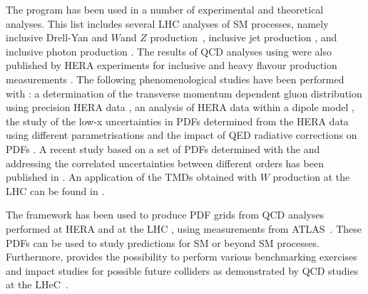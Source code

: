 The \fitter program has been used in a number of experimental and theoretical analyses. 
This list includes several LHC analyses of SM processes, namely
inclusive Drell-Yan and $W$and $Z$ production~\cite{atlas:strange,cms:strange,atlas:hm,Aad:2014qja,Aad:2014xca}, 
inclusive jet production \cite{atlas:jets}, and inclusive photon production \cite{atlas:photons}.
The results of QCD analyses using \fitter were also
published by HERA experiments for inclusive \cite{h1zeus:2009wt,h1:2012kk} and
 heavy flavour production measurements \cite{h1zeus:charm, Abramowicz:2014zub}.
The following phenomenological studies have been performed with \fitter:
a determination of the transverse momentum dependent gluon distribution using precision HERA data \cite{Hautmann:2013tba}, 
an analysis of HERA data within a dipole model \cite{Luszczak:2013rxa},
the study of the low-x uncertainties in PDFs determined from the HERA data using 
different parametrisations \cite{Chebyshev} and the impact of QED radiative corrections on PDFs \cite{Sadykov:2014aua}.
A recent study based on a set of PDFs determined with the \fitter and addressing 
the correlated uncertainties between different orders has been published in \cite{hfcorrpaper}. 
An application of the TMDs obtained with \fitter
$W$ production at the LHC can be found in \cite{Dooling:2014kia}.

The \fitter framework has been used to produce PDF grids from QCD analyses performed at 
HERA \cite{h1zeus:2009wt,hera:grids} and at the LHC \cite{atlas:grids}, using 
measurements from ATLAS~\cite{atlas:strange,atlas:jets}. These PDFs can be used to study predictions for SM 
or beyond SM processes. Furthermore, \fitter provides the possibility to perform various benchmarking exercises
\cite{Butterworth:2014efa} and impact studies for possible future colliders
as demonstrated by QCD studies at the LHeC~\cite{lhec:studies}.









